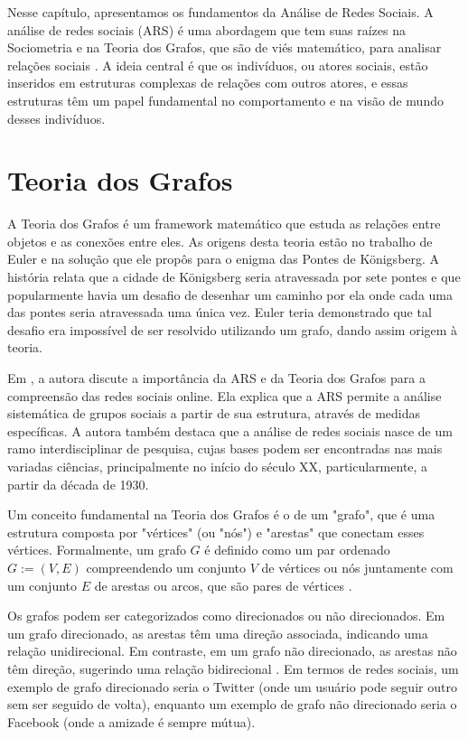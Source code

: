 Nesse capítulo, apresentamos os fundamentos da Análise de Redes Sociais. A análise de redes sociais (ARS) é uma abordagem que tem suas raízes na Sociometria e na Teoria dos Grafos, que são de viés matemático, para analisar relações sociais \cite{2015_Recuero_BOOK}. A ideia central é que os indivíduos, ou atores sociais, estão inseridos em estruturas complexas de relações com outros atores, e essas estruturas têm um papel fundamental no comportamento e na visão de mundo desses indivíduos.

\section{Teoria dos Grafos}
A Teoria dos Grafos é um framework matemático que estuda as relações entre objetos e as conexões entre eles. As origens desta teoria estão no trabalho de Euler e na solução que ele propôs para o enigma das Pontes de Königsberg. A história relata que a cidade de Königsberg seria atravessada por sete pontes e que popularmente havia um desafio de desenhar um caminho por ela onde cada uma das pontes seria atravessada uma única vez. Euler teria demonstrado que tal desafio era impossível de ser resolvido utilizando um grafo, dando assim origem à teoria.

Em , a autora discute a importância da ARS e da Teoria dos Grafos para a compreensão das redes sociais online. Ela explica que a ARS permite a análise sistemática de grupos sociais a partir de sua estrutura, através de medidas específicas. A autora também destaca que a análise de redes sociais nasce de um ramo interdisciplinar de pesquisa, cujas bases podem ser encontradas nas mais variadas ciências, principalmente no início do século XX, particularmente, a partir da década de 1930.

Um conceito fundamental na Teoria dos Grafos é o de um "grafo", que é uma estrutura composta por "vértices" (ou "nós") e "arestas" que conectam esses vértices. Formalmente, um grafo $G$ é definido como um par ordenado $G := (V, E)$ compreendendo um conjunto $V$ de vértices ou nós juntamente com um conjunto $E$ de arestas ou arcos, que são pares de vértices \cite{1976_Bondy_BOOK}.

Os grafos podem ser categorizados como direcionados ou não direcionados. Em um grafo direcionado, as arestas têm uma direção associada, indicando uma relação unidirecional. Em contraste, em um grafo não direcionado, as arestas não têm direção, sugerindo uma relação bidirecional \cite{2000_West_BOOK}. Em termos de redes sociais, um exemplo de grafo direcionado seria o Twitter (onde um usuário pode seguir outro sem ser seguido de volta), enquanto um exemplo de grafo não direcionado seria o Facebook (onde a amizade é sempre mútua).


